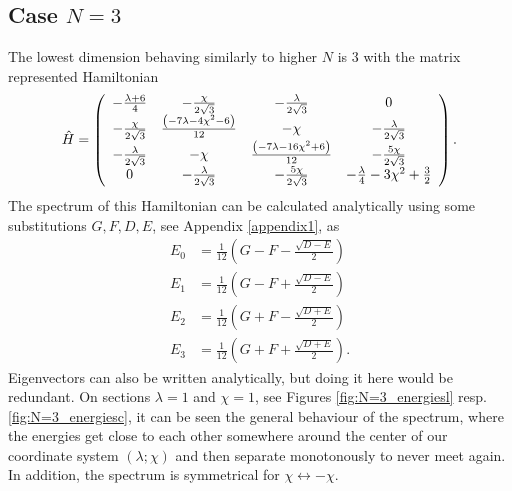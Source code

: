\subsection{Case $N=3$}
The lowest dimension behaving similarly to higher $N$ is 3 with the matrix represented Hamiltonian
\begin{equation}
    \hat{H}=\left(
        \begin{array}{cccc}
         -\frac{ \lambda +6}{4} & -\frac{\chi }{2 \sqrt{3}} & -\frac{\lambda }{2 \sqrt{3}} & 0 \\
         -\frac{\chi }{2 \sqrt{3}} & \frac{ \left(-7 \lambda -4 \chi ^2-6\right)}{12} & -\chi  & -\frac{\lambda }{2 \sqrt{3}} \\
         -\frac{\lambda }{2 \sqrt{3}} & -\chi  & \frac{ \left(-7 \lambda -16 \chi ^2+6\right)}{12} & -\frac{5 \chi }{2 \sqrt{3}} \\
         0 & -\frac{\lambda }{2 \sqrt{3}} & -\frac{5 \chi }{2 \sqrt{3}} & -\frac{\lambda }{4}-3 \chi ^2+\frac{3}{2} \\
        \end{array}
        \right).
\end{equation}
The spectrum of this Hamiltonian can be calculated analytically using some substitutions $G, F, D, E$, see Appendix \ref{appendix1}, as
\begin{align}
        E_0 &= \frac{1}{12} \left(G-F-\frac{\sqrt{D-E}}{2}\right)
        \label{eq:N=3_en0}\\
        E_1 &= \frac{1}{12}  \left(G-F+\frac{\sqrt{D-E}}{2}\right)
        \label{eq:N=3_en1}\\
        E_2 &= \frac{1}{12} \left(G+F-\frac{\sqrt{D+E}}{2}\right)
        \label{eq:N=3_en2}\\
        E_3 &= \frac{1}{12}  \left(G+F+\frac{\sqrt{D+E}}{2}\right).
        \label{eq:N=3_en3}
\end{align}
Eigenvectors can also be written analytically, but doing it here would be redundant. On sections $\lambda=1$ and $\chi=1$, see Figures \ref{fig:N=3_energiesl} resp. \ref{fig:N=3_energiesc}, it can be seen the general behaviour of the spectrum, where the energies get close to each other somewhere around the center of our coordinate system $(\lambda;\chi)$ and then separate monotonously to never meet again. In addition, the spectrum is symmetrical for $\chi\leftrightarrow -\chi$.
